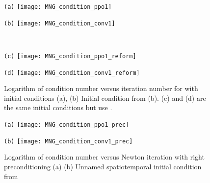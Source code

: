 \begin{description}
\begin{figure}[ht]
  \begin{minipage}[height=.30\textheight]{.45\textwidth}
    \centering \small{\texttt{(a)}}
    \texttt{[image: MNG\_condition\_ppo1]}
  \end{minipage}
  \begin{minipage}[height=.30\textheight]{.45\textwidth}
    \centering \small{\texttt{(b)}}
    \texttt{[image: MNG\_condition\_conv1]}
  \end{minipage}
  \\
  \begin{minipage}[height=.30\textheight]{.45\textwidth}
    \centering \small{\texttt{(c)}}
    \texttt{[image: MNG\_condition\_ppo1\_reform]}
  \end{minipage}
  \centering
  \begin{minipage}[height=.30\textheight]{.45\textwidth}
    \centering \small{\texttt{(d)}}
    \texttt{[image: MNG\_condition\_conv1\_reform]}
  \end{minipage}
   \caption{
  Logarithm of condition number versus iteration number for
  with initial conditions (a), (b) Initial condition from  (b). (c) and (d) are the same initial conditions but use .
   }
  \label{fig:MNG_condition}
\end{figure}


\begin{figure}[ht]
\begin{minipage}[height=.32\textheight]{.45\textwidth}
\centering \small{\texttt{(a)}}
\texttt{[image: MNG\_condition\_ppo1\_prec]}
\end{minipage}
\begin{minipage}[height=.32\textheight]{.45\textwidth}
\centering \small{\texttt{(b)}}
\texttt{[image: MNG\_condition\_conv1\_prec]}
\end{minipage}
\caption{ \label{fig:MNG_condition_prec}
Logarithm of condition number versus Newton iteration with right preconditioning (a) 
(b) Unnamed spatiotemporal initial condition from 
}
\end{figure}

\end{description}
